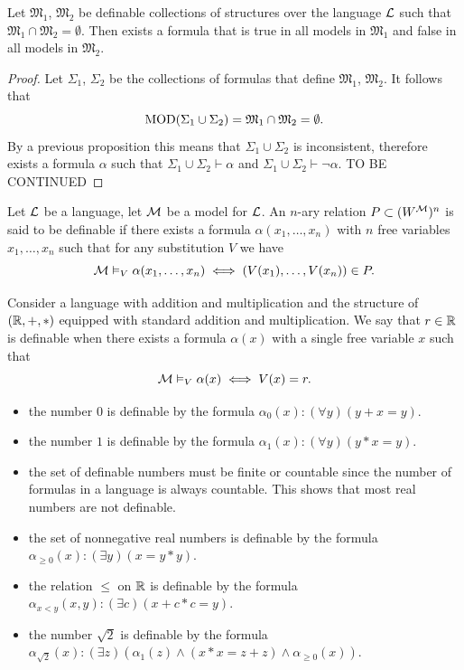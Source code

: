 \documentclass[11pt,a4paper]{article}
\DeclareRobustCommand{\models}{%
  \mathrel{\vDash}%
}
\begin{document}
\begin{proposition}
  Let $\mathfrak M_1$, $\mathfrak M_2$ be definable collections of structures
  over the language $\mathcal{L}$ such that 
  $\mathfrak M_1 \cap \mathfrak M_2 = \emptyset$.
  Then exists a formula that is true in all models in $\mathfrak M_1$
  and false in all models in $\mathfrak M_2$.
\end{proposition}
\begin{proof}
  Let $\Sigma_1$, $\Sigma_2$ be the collections of formulas that define
  $\mathfrak M_1$, $\mathfrak M_2$.
  It follows that
  \[
    \operatorname{MOD}(\Sigma_1 \cup \Sigma_2) =
    \mathfrak M_1 \cap \mathfrak M_2 =
    \emptyset.
  \]
  By a previous proposition this means that $\Sigma_1 \cup \Sigma_2$ is
  inconsistent, therefore exists a formula $\alpha$ such that
  $\Sigma_1 \cup \Sigma_2 \vdash \alpha$ and
  $\Sigma_1 \cup \Sigma_2 \vdash \neg \alpha$.
  TO BE CONTINUED
\end{proof}

\begin{definition}
  Let $\mathcal{L}$ be a language, let $\mathcal{M}$ be a model for $\mathcal{L}$.
  An $n$-ary relation $P \subset (W^{\mathcal{M}})^n$ is said to be definable if there
  exists a formula $\alpha(x_1,\dots,x_n)$ with $n$ free variables 
  $x_1,\dots,x_n$ such that for any substitution $V$ we have
  \[
    \M \models_V \alpha(x_1,\dots,x_n) \iff
    (V(x_1),\dots,V(x_n)) \in P.
  \]
\end{definition}

\begin{example}
  Consider a language with addition and multiplication and the structure
  of $(\mathbb{R},+,*)$ equipped with standard addition and multiplication.
  We say that $r \in \mathbb{R}$ is definable when there exists a formula
  $\alpha(x)$ with a single free variable $x$ such that
  \[
    \M \models_V \alpha(x) \iff
    V(x) = r.
  \]
\end{example}

\begin{itemize}
  \item the number $0$ is definable by the formula 
    $\alpha_0(x) \colon (\forall y)(y + x = y)$.
  \item the number $1$ is definable by the formula
    $\alpha_1(x) \colon (\forall y)(y * x = y)$.
  \item the set of definable numbers must be finite or countable since the
    number of formulas in a language is always countable.
    This shows that most real numbers are not definable.
  \item the set of nonnegative real numbers is definable by the formula
    $\alpha_{\geq 0}(x) \colon (\exists y)(x = y * y)$.
  \item the relation $\le$ on $\mathbb{R}$ is definable by the formula
    $\alpha_{x < y}(x,y) \colon (\exists c)(x + c * c = y)$.
  \item the number $\sqrt{2}$ is definable by the formula
    $\alpha_{\sqrt 2}(x) \colon (\exists z)(\alpha_1(z) \land (x * x = z + z)
    \land \alpha_{\geq 0}(x))$.
\end{itemize}
\end{document}
